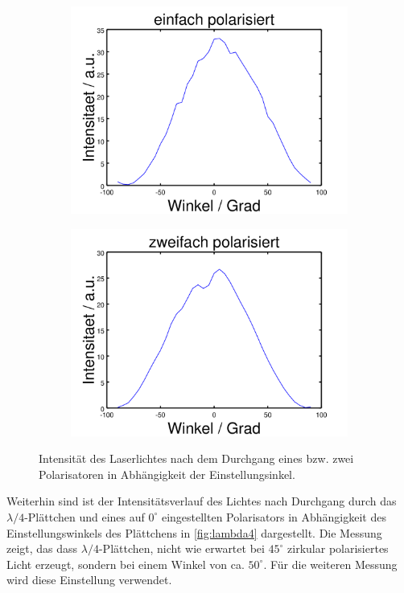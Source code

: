 \documentclass[numbers=noenddot,a4paper,notitlepage,twoside,BCOR15mm]{scrartcl}
\begin{document}
\begin{figure}[h]
	\centering
	\begin{subfigure}{.49\textwidth}
		\centering
		\includegraphics[width=0.8\linewidth]{pics/1xpol.png}
	\end{subfigure}
	\begin{subfigure}{.49\textwidth}
		\centering
		\includegraphics[width=0.8\linewidth]{pics/2xpol.png}
	\end{subfigure}
	\caption{Intensität des Laserlichtes nach dem Durchgang eines bzw. zwei Polarisatoren in Abhängigkeit der Einstellungsinkel.}
	\label{fig:1xpol}
\end{figure}

Weiterhin sind ist der Intensitätsverlauf des Lichtes nach Durchgang durch das $\lambda/4$-Plättchen und eines auf $0^\circ$ eingestellten Polarisators in Abhängigkeit des Einstellungswinkels des Plättchens in \autoref{fig:lambda4} dargestellt. Die Messung zeigt, das dass $\lambda /4$-Plättchen, nicht wie erwartet bei $45^\circ$ zirkular polarisiertes Licht erzeugt, sondern bei einem Winkel von ca. $50^\circ$. Für die weiteren Messung wird diese Einstellung verwendet. \clearpage
\end{document}
